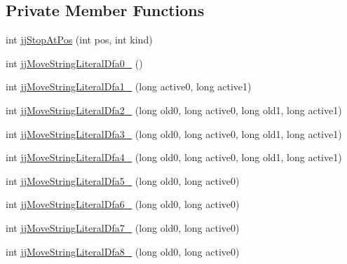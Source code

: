 \subsection*{Private Member Functions}
\begin{DoxyCompactItemize}
\item 
int \hyperlink{classde_1_1uulm_1_1ecs_1_1ai_1_1owlapi_1_1krssparser_1_1_k_r_s_s2_parser_token_manager_a63fef18f1852b10b64bcb663b9eceddb}{jj\-Stop\-At\-Pos} (int pos, int kind)
\item 
int \hyperlink{classde_1_1uulm_1_1ecs_1_1ai_1_1owlapi_1_1krssparser_1_1_k_r_s_s2_parser_token_manager_a2b796218a6c112ddda235d0c5617f7a9}{jj\-Move\-String\-Literal\-Dfa0\-\_} ()
\item 
int \hyperlink{classde_1_1uulm_1_1ecs_1_1ai_1_1owlapi_1_1krssparser_1_1_k_r_s_s2_parser_token_manager_ad32c7a190931579728f387eaf79a2f36}{jj\-Move\-String\-Literal\-Dfa1\-\_} (long active0, long active1)
\item 
int \hyperlink{classde_1_1uulm_1_1ecs_1_1ai_1_1owlapi_1_1krssparser_1_1_k_r_s_s2_parser_token_manager_a7c0aa7187b6d2ebc6c37f02fcc9906a1}{jj\-Move\-String\-Literal\-Dfa2\-\_} (long old0, long active0, long old1, long active1)
\item 
int \hyperlink{classde_1_1uulm_1_1ecs_1_1ai_1_1owlapi_1_1krssparser_1_1_k_r_s_s2_parser_token_manager_aac269c740421b0bdc9e2155ef7902893}{jj\-Move\-String\-Literal\-Dfa3\-\_} (long old0, long active0, long old1, long active1)
\item 
int \hyperlink{classde_1_1uulm_1_1ecs_1_1ai_1_1owlapi_1_1krssparser_1_1_k_r_s_s2_parser_token_manager_a7e403a90d00e808ea0283919c93871ce}{jj\-Move\-String\-Literal\-Dfa4\-\_} (long old0, long active0, long old1, long active1)
\item 
int \hyperlink{classde_1_1uulm_1_1ecs_1_1ai_1_1owlapi_1_1krssparser_1_1_k_r_s_s2_parser_token_manager_ae418b001498b47dd56b6e66c186686f7}{jj\-Move\-String\-Literal\-Dfa5\-\_} (long old0, long active0)
\item 
int \hyperlink{classde_1_1uulm_1_1ecs_1_1ai_1_1owlapi_1_1krssparser_1_1_k_r_s_s2_parser_token_manager_a58b40b5b3d5cbf1842b6cd8613bb8ebd}{jj\-Move\-String\-Literal\-Dfa6\-\_} (long old0, long active0)
\item 
int \hyperlink{classde_1_1uulm_1_1ecs_1_1ai_1_1owlapi_1_1krssparser_1_1_k_r_s_s2_parser_token_manager_a48ff6d017f625dc3ef93339d5a79815b}{jj\-Move\-String\-Literal\-Dfa7\-\_} (long old0, long active0)
\item 
int \hyperlink{classde_1_1uulm_1_1ecs_1_1ai_1_1owlapi_1_1krssparser_1_1_k_r_s_s2_parser_token_manager_a2bf622244b9798e5128cdb70174e8058}{jj\-Move\-String\-Literal\-Dfa8\-\_} (long old0, long active0)

\end{DoxyCompactItemize}
